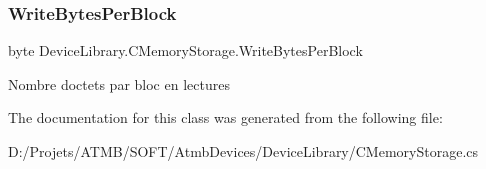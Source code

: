 \subsubsection{\texorpdfstring{Write\+Bytes\+Per\+Block}{WriteBytesPerBlock}}
{\footnotesize\ttfamily byte Device\+Library.\+C\+Memory\+Storage.\+Write\+Bytes\+Per\+Block\hspace{0.3cm}{\ttfamily [get]}}



Nombre d\textquotesingle{}octets par bloc en lectures 



The documentation for this class was generated from the following file\+:\begin{DoxyCompactItemize}
\item 
D\+:/\+Projets/\+A\+T\+M\+B/\+S\+O\+F\+T/\+Atmb\+Devices/\+Device\+Library/C\+Memory\+Storage.\+cs\end{DoxyCompactItemize}
